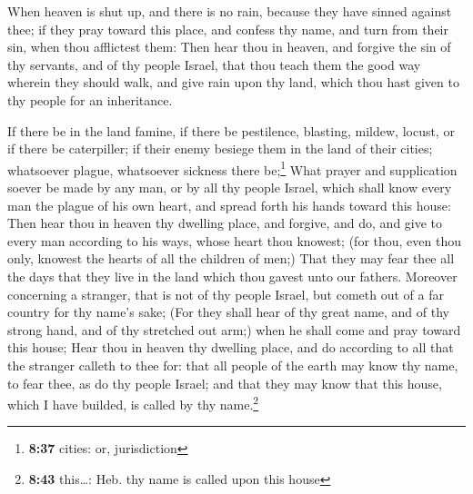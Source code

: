  When heaven is shut up, and there is no rain, because
they have sinned against thee; if they pray toward this place, and
confess thy name, and turn from their sin, when thou afflictest them:
 Then hear thou in heaven, and forgive the sin of thy
servants, and of thy people Israel, that thou teach them the good way
wherein they should walk, and give rain upon thy land, which thou hast
given to thy people for an inheritance.

 If there be in the land famine, if there be pestilence,
blasting, mildew, locust, or if there be caterpiller; if their enemy
besiege them in the land of their cities; whatsoever plague, whatsoever
sickness there be;\footnote{\textbf{8:37} cities: or, jurisdiction}
 What prayer and supplication soever be made by any man,
or by all thy people Israel, which shall know every man the plague of
his own heart, and spread forth his hands toward this house:
 Then hear thou in heaven thy dwelling place, and
forgive, and do, and give to every man according to his ways, whose
heart thou knowest; (for thou, even thou only, knowest the hearts of all
the children of men;)  That they may fear thee all the
days that they live in the land which thou gavest unto our fathers.
 Moreover concerning a stranger, that is not of thy
people Israel, but cometh out of a far country for thy name's sake;
 (For they shall hear of thy great name, and of thy
strong hand, and of thy stretched out arm;) when he shall come and pray
toward this house;  Hear thou in heaven thy dwelling
place, and do according to all that the stranger calleth to thee for:
that all people of the earth may know thy name, to fear thee, as do thy
people Israel; and that they may know that this house, which I have
builded, is called by thy name.\footnote{\textbf{8:43} this\ldots: Heb.
  thy name is called upon this house}

